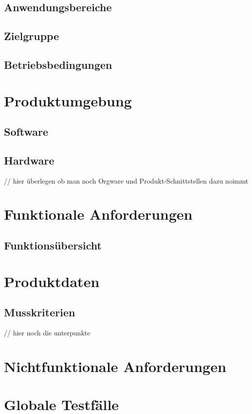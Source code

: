 \documentclass[parskip=full]{scrartcl}
\begin{document}
\subsection{Anwendungsbereiche}

\subsection{Zielgruppe}

\subsection{Betriebsbedingungen}

\section{Produktumgebung}

\subsection{Software}

\subsection{Hardware}
// hier überlegen ob man noch Orgware und Produkt-Schnittstellen dazu noimmt
\section{Funktionale Anforderungen}

\subsection{Funktionsübersicht}

\section{Produktdaten}

\subsection{Musskriterien} // hier noch die unterpunkte

\section{Nichtfunktionale Anforderungen}

\section{Globale Testfälle}
\end{document}
